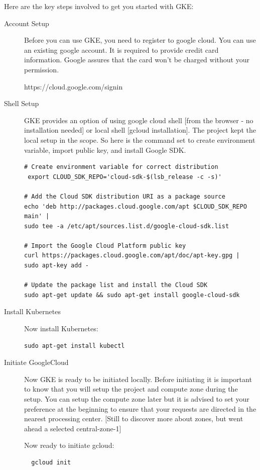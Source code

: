 Here are the key steps involved to get you started with GKE:
\begin{description}
\item[Account Setup] Before you can use GKE, you need to register to google
 cloud. You can use an existing google account. It is required to provide 
 credit card information. 
Google assures that the card won't be charged without your permission.

https://cloud.google.com/signin

\item[Shell Setup] GKE provides an option of using google cloud shell [from the
 browser - no installation needed] 
or local shell [gcloud installation]. The project kept the local setup in the 
scope. So here is the command set to create environment variable, import
public key, and install Google SDK.

\begin{verbatim}
# Create environment variable for correct distribution
 export CLOUD_SDK_REPO='cloud-sdk-$(lsb_release -c -s)'

# Add the Cloud SDK distribution URI as a package source
echo 'deb http://packages.cloud.google.com/apt $CLOUD_SDK_REPO main' | 
sudo tee -a /etc/apt/sources.list.d/google-cloud-sdk.list

# Import the Google Cloud Platform public key
curl https://packages.cloud.google.com/apt/doc/apt-key.gpg | sudo apt-key add -

# Update the package list and install the Cloud SDK
sudo apt-get update && sudo apt-get install google-cloud-sdk
\end{verbatim}
\item[Install Kubernetes] Now install Kubernetes:
\begin{verbatim}
sudo apt-get install kubectl
\end{verbatim}
\item[Initiate GoogleCloud] Now GKE is ready to be initiated locally. Before 
initiating it is 
important to know that you will setup the project and compute zone during the 
setup. You can setup the compute zone later but it is advised to set your 
preference at the beginning to ensure that your requests are directed in the 
nearest processing center. [Still to discover more about zones, but went ahead 
a selected central-zone-1] 

Now ready to initiate gcloud:
\begin{verbatim}
  gcloud init
\end{verbatim}


\end{description}
